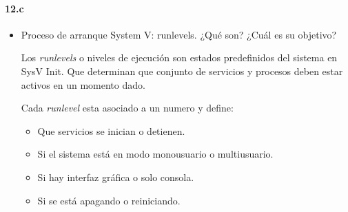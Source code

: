 \documentclass[10pt,a4paper]{paper}
\begin{document}
\paragraph{12.c}
\begin{itemize}
	
	\item {Proceso de arranque System V:} runlevels. ¿Qué son? ¿Cuál es su objetivo?
	
	Los \textit{runlevels} o niveles de ejecución son estados predefinidos del sistema en SysV Init. Que determinan que conjunto de servicios y procesos deben estar activos en un momento dado.
	
	Cada \textit{runlevel} esta asociado a un numero y define:
	
	\begin{itemize}
		\item Que servicios se inician o detienen.
		
		\item Si el sistema está en modo monousuario o multiusuario.
		
		\item Si hay interfaz gráfica o solo consola.
		
		\item Si se está apagando o reiniciando.
	\end{itemize}
	
	
	
\end{itemize}


	
\end{document}
